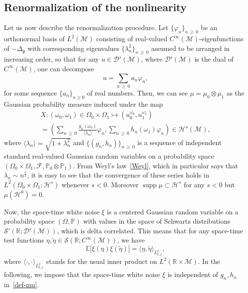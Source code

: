 \documentclass[10pt]{amsart}
\theoremstyle{definition}\newtheorem{defi}[theo]{Definition}\newtheorem{rema}[theo]{Remark}\newtheorem{exam}[theo]{Example}\newtheorem{exem}[theo]{Example}\newtheorem{nota}[theo]{Notation}
\newcommand{\R}{\mathbb{R}}
\newcommand{\E}{\mathbb{E}}
\newcommand{\Prob}{\mathbb{P}}
\DeclareMathOperator*{\supp}{supp}
\newcommand{\F}{\mathcal{F}}
\renewcommand{\S}{\mathcal{S}}
\newcommand{\Dp}{\mathcal{D}'}
\newcommand{\M}{\mathcal{M}}
\renewcommand{\H}{\mathcal{H}}
\newcommand{\g}{\mathfrak{g}}
\newcommand{\ld}{\lambda}
\newcommand{\Dlg}{\Delta_{\g}}
\renewcommand{\o}{\omega}
\renewcommand{\O}{\Omega}
\newcommand{\jb}[1] {\langle #1 \rangle}
\begin{document}
\subsection{Renormalization of the nonlinearity}
Let us now describe the renormalization procedure. Let $\{\varphi_n\}_{n\,\geq\,0}$ be an orthonormal basis of $L^2(\M)$ consisting of real-valued $C^\infty(\M)$-eigenfunctions of $-\Dlg$ with corresponding eigenvalues $\{\lambda_n^2\}_{n\,\geq\,0}$ assumed to be arranged in increasing order, so that for any $u\in\Dp(\M)$, where $\Dp(\M)$ is the dual of $C^{\infty}(\M)$, one can decompose
\begin{equation*}
u = \sum_{n\,\geq\,0}a_n\varphi_n,
\end{equation*}
for some sequence $\{a_n\}_{n\geq 0}$ of real numbers. Then, we can see $\mu =\mu_0\otimes \mu_1$ as the Gaussian probability measure induced under the map
\begin{multline}\label{def-mu}
X : (\o_0,\o_1) \in \O_0\times\O_1 \longmapsto \left(u_0^{\o_0}, u_1^{\o_1}\right)\\
 = \left(\sum_{n\,\ge\,0} \frac{g_{n}(\o_0)}{\jb{\lambda_n}}\varphi_n,
\sum_{n\,\ge\,0} h_{n}(\o_1)\varphi_n\right)\in\H^s(\M),
\end{multline}
where $\jb{\lambda_n} = \sqrt{1+\lambda_n^2}$ and $\{(g_{n}, h_{n})\}_{n\,\ge\,0}$ is a sequence of independent standard real-valued Gaussian random variables on a probability space $(\O_0\times \O_1, \F, \Prob_0\otimes\Prob_1)$. From Weyl's law~\eqref{Weyl}, which in particular says that $\ld_n \sim n^\frac{1}{2}$, it is easy to see that the convergence of these series holds in $L^2(\O_0\times\O_1;\H^s)$ whenever $s<0$. Moreover $\supp \mu \subset \H^s$ for any $s<0$ but $\mu(\H^0)=0$.

Now, the space-time white noise $\xi$ is a centered Gaussian random variable on a probability space $(\O,\Prob)$ with values in the space of Schwartz distributions $\S'(\R;\Dp(\M))$, which is delta correlated. This means that for any space-time test functions $\eta,\widetilde{\eta}\in \S(\R;C^{\infty}(\M))$, we have
\begin{equation*}
\E\big[\xi(\eta)\xi(\widetilde{\eta})\big] = \langle \eta,\widetilde{\eta}\rangle_{L^2_{t,x}},
\end{equation*}
where $\langle \cdot,\cdot\rangle_{L^2_{t,x}}$ stands for the usual inner product on $L^2(\R\times\M)$. In the following, we impose that the space-time white noise $\xi$ is independent of $g_n,h_n$ in~\eqref{def-mu}.
\end{document}
